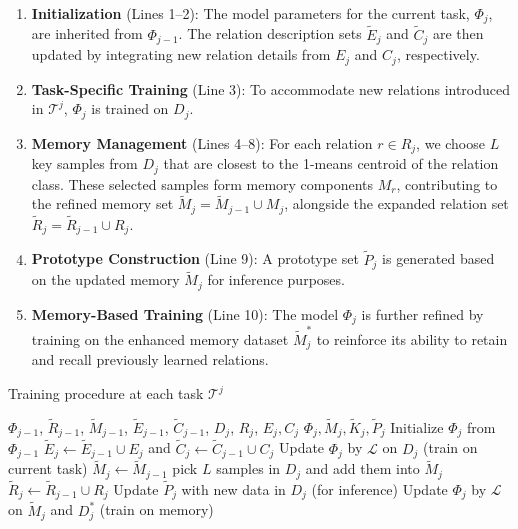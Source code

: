 \begin{enumerate}
    \item \textbf{Initialization} (Lines 1--2):  
    The model parameters for the current task, $\Phi_j$, are inherited from $\Phi_{j-1}$. The relation description sets $\tilde{E}_j$ and $\tilde{C}_j$ are then updated by integrating new relation details from $E_j$ and $C_j$, respectively.
    
    \item \textbf{Task-Specific Training} (Line 3):  
    To accommodate new relations introduced in $\mathcal{T}^j$, $\Phi_j$ is trained on $D_j$.
    
    \item \textbf{Memory Management} (Lines 4--8):  
    For each relation $r \in R_j$, we choose $L$ key samples from $D_j$ that are closest to the 1-means centroid of the relation class. These selected samples form memory components $M_r$, contributing to the refined memory set $\tilde{M}_j = \tilde{M}_{j-1} \cup M_j$, alongside the expanded relation set $\tilde{R}_j = \tilde{R}_{j-1} \cup R_j$.

    \item \textbf{Prototype Construction} (Line 9):  
    A prototype set $\tilde{P}_j$ is generated based on the updated memory $\tilde{M}_j$ for inference purposes.

    \item \textbf{Memory-Based Training} (Line 10):  
    The model $\Phi_j$ is further refined by training on the enhanced memory dataset $\tilde{M}_j^*$ to reinforce its ability to retain and recall previously learned relations.
    

\end{enumerate}

\begin{algorithm}
\caption{Training procedure at each task $\mathcal{T}^j$}
\label{alg:training}
\begin{algorithmic}[1]
\Require $\Phi_{j-1}$, $\tilde{R}_{j-1}$,  $\tilde{M}_{j-1}$, $\tilde{E}_{j-1}$, $\tilde{C}_{j-1}$, $D_j$, $R_j$, $E_j, C_j$ 
\Ensure $\Phi_j, \tilde{M}_j, \tilde{K}_j, \tilde{P}_j$
\State Initialize $\Phi_j$ from $\Phi_{j-1}$
\State $\tilde{E}_j \gets \tilde{E}_{j-1} \cup E_j$ and $\tilde{C}_j \gets \tilde{C}_{j-1} \cup C_j$ 
\State Update $\Phi_j$ by $\mathcal{L}$ on $D_j$ (train on current task)
\State $\tilde{M}_j \gets \tilde{M}_{j-1}$
    \State pick $L$ samples in $D_j$ and add them into $\tilde{M}_j$
\EndFor
\State $\tilde{R}_j \gets \tilde{R}_{j-1} \cup R_j$
\State Update $\tilde{P}_j$ with new data in $D_j$ (for inference)
\State Update $\Phi_j$ by $\mathcal{L}$ on $\tilde{M}_j$ and $D^*_j$ (train on memory)
\end{algorithmic}
\end{algorithm}


